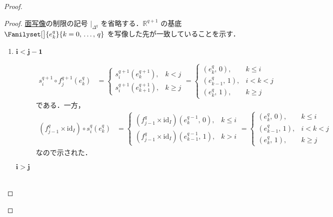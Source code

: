 \documentclass[algtopo_main]{subfiles}
\begin{document}
\begin{proof}
    \begin{proof}
        \hyperref[def:facemap]{面写像}の制限の記号 $|_{\Delta^q}$ を省略する．$\mathbb{R}^{q+1}$ の基底 $\Familyset[\big]{e_k^q}{k = 0,\, \dots ,\, q}$ を写像した先が一致していることを示す．
        \begin{enumerate}
            \item \begin{description}
                \item[\textbf{$\bm{i < j-1}$}] 
                \begin{align}
                    s_i^{q+1} \circ f_j^{q+1} (e_k^q) &=
                    \begin{cases}
                        s_i^{q+1}(e_k^{q+1}), &k < j \\
                        s_i^{q+1}(e_{k+1}^{q+1}), &k \ge j
                    \end{cases}
                    =
                    \begin{cases}
                        (e_k^q,\, 0), &k \le i \\
                        (e_{k-1}^q,\, 1), &i < k < j \\
                        (e_{k}^q,\, 1), &k \ge j
                    \end{cases}
                \end{align}
                である．一方，
                \begin{align}
                    (f_{j-1}^{q} \times \mathrm{id}_I) \circ s_i^q(e_k^q) &= 
                    \begin{cases}
                        (f_{j-1}^{q} \times \mathrm{id}_I)(e_k^{q-1},\, 0), &k \le i \\
                        (f_{j-1}^{q} \times \mathrm{id}_I)(e_{k-1}^{q-1},\, 1), &k > i
                    \end{cases}
                    =
                    \begin{cases}
                        (e_k^q,\, 0), &k \le i \\
                        (e_{k-1}^q,\, 1), &i < k < j \\
                        (e_k^q,\, 1), &k \ge j
                    \end{cases}
                \end{align}
                なので示された．
                \item[\textbf{$\bm{i > j}$}] 
                \begin{align}

\end{align}
\end{description}
\end{enumerate}
\end{proof}
\end{proof}
\end{document}
